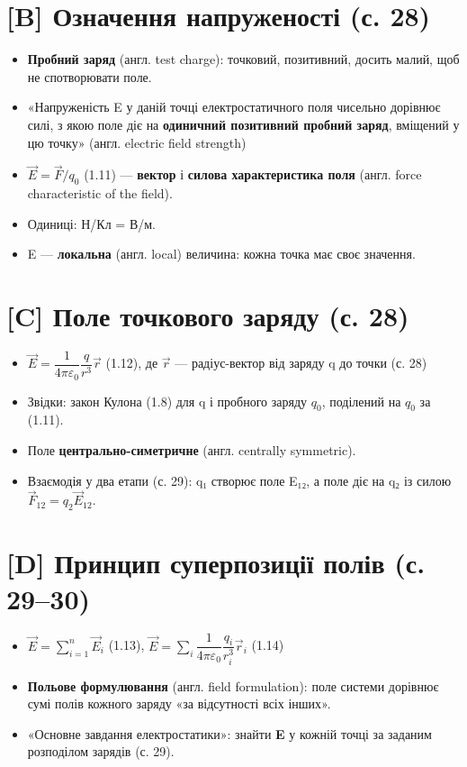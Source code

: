 \documentclass[11pt,a4paper,oneside]{book}
\begin{document}
\section*{[B] Означення напруженості (с. 28)}
\begin{itemize}
\item \textbf{Пробний заряд} (англ. test charge): точковий, позитивний, досить малий, щоб не спотворювати поле.
\item «Напруженість E у даній точці електростатичного поля чисельно дорівнює силі, з якою поле діє на \textbf{одиничний позитивний пробний заряд}, вміщений у цю точку» (англ. electric field strength)
\item $\vec E = \vec F / q_0$ (1.11) — \textbf{вектор} і \textbf{силова характеристика поля} (англ. force characteristic of the field).
\item Одиниці: Н/Кл = В/м.
\item E — \textbf{локальна} (англ. local) величина: кожна точка має своє значення.
\end{itemize}

\section*{[C] Поле точкового заряду (с. 28)}
\begin{itemize}
\item $\vec E = \dfrac{1}{4\pi\varepsilon_0}\dfrac{q}{r^3}\vec r$ (1.12), де $\vec r$ — радіус-вектор від заряду q до точки (с. 28)
\item Звідки: закон Кулона (1.8) для q і пробного заряду $q_0$, поділений на $q_0$ за (1.11).
\item Поле \textbf{центрально-симетричне} (англ. centrally symmetric).
\item Взаємодія у два етапи (с. 29): q₁ створює поле E₁₂, а поле діє на q₂ із силою $\vec F_{12} = q_2\vec E_{12}$.
\end{itemize}

\section*{[D] Принцип суперпозиції полів (с. 29–30)}
\begin{itemize}
\item $\vec E = \sum_{i=1}^n \vec E_i$ (1.13), $\vec E = \sum_i \dfrac{1}{4\pi\varepsilon_0}\dfrac{q_i}{r_i^3}\vec r_i$ (1.14)
\item \textbf{Польове формулювання} (англ. field formulation): поле системи дорівнює сумі полів кожного заряду «за відсутності всіх інших».
\item «Основне завдання електростатики»: знайти \textbf{E} у кожній точці за заданим розподілом зарядів (с. 29).
\end{itemize}
\end{document}

